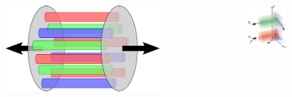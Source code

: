\documentclass[aspectratio=169,11pt,usenames,dvipsnames]{beamer}
\begin{document}
\begin{frame}
\begin{columns}[onlytextwidth,t]
    \end{columns}

    \begin{columns}[onlytextwidth,t]

        \vspace{5pt}
        \begin{center}
            \begin{figure}
                \centering
                \hspace{-5pt}\includegraphics[width=0.9\textwidth]{images/glasma.eps}
            \end{figure}
        \end{center}

       \vspace{-5pt}
       \begin{center}
            \begin{figure}
                \centering
                \includegraphics[width=0.7\textwidth]{images/1-s2.0-S0370269320306134-gr003_lrg.jpg}
            \end{figure}
        \end{center}


\end{columns}
\end{frame}
\end{document}
